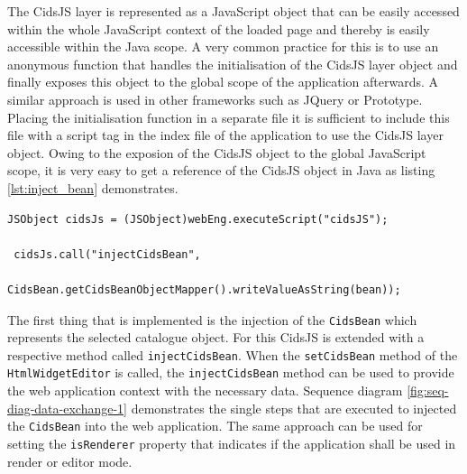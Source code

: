 The CidsJS layer is represented as a JavaScript object that can be easily accessed within the whole JavaScript context of the loaded page and thereby is easily accessible within the Java scope.
A very common practice for this is to use an anonymous function that handles the initialisation of the CidsJS layer object and finally exposes this object to the global scope of the application afterwards. 
A similar approach is used in other frameworks such as JQuery or Prototype.
Placing the initialisation function in a separate file it is sufficient to include this file with a script tag in the index file of the application to use the CidsJS layer object.
Owing to the exposion of the CidsJS object to the global JavaScript scope, it is very easy to get a reference of the CidsJS object in Java as listing \ref{lst:inject_bean} demonstrates.
 

\begin{lstlisting}[label=lst:inject_bean,caption=Injecting the cidsBean to the JavaScript application]
JSObject cidsJs = (JSObject)webEng.executeScript("cidsJS");

 cidsJs.call("injectCidsBean",
              CidsBean.getCidsBeanObjectMapper().writeValueAsString(bean));
\end{lstlisting}

The first thing that is implemented is the injection of the \texttt{CidsBean} which represents the selected catalogue object.
For this CidsJS is extended with a respective method called \texttt{injectCidsBean}.
When the \texttt{setCidsBean} method of the \texttt{HtmlWidgetEditor} is called, the \texttt{injectCidsBean} method can be used to provide the web application context with the necessary data.
Sequence diagram  \ref{fig:seq-diag-data-exchange-1} demonstrates the single steps that are executed to injected the  \texttt{CidsBean} into the web application.
The same approach can be used for setting the \texttt{isRenderer} property that indicates if the application shall be used in render or editor mode.

